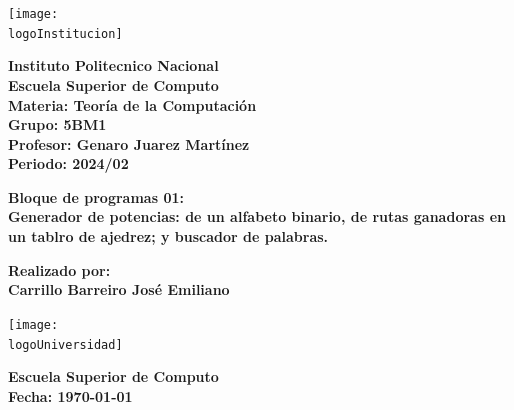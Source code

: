\documentclass{article}
\newcommand{\logoInstitucion}{logotipo_ipn.png} %
\newcommand{\logoUniversidad}{EscudoESCOM.png} %
\newcommand{\nombreInstituto}{Instituto Politecnico Nacional}
\newcommand{\facultad}{Escuela Superior de Computo}
\newcommand{\materia}{Teoría de la Computación}
\newcommand{\grupo}{5BM1}
\newcommand{\profesora}{Genaro Juarez Martínez}
\newcommand{\periodo}{2024/02}
\newcommand{\alumno}{Carrillo Barreiro José Emiliano}
\begin{document}
\begin{titlepage}
    \begin{center}
        \vspace*{1cm}

        \texttt{[image: \\logoInstitucion]}

        \vspace{1cm}

        \textbf{\LARGE \nombreInstituto} \\
        \textbf{\Large \facultad} \\
        \vspace{0.5cm}
        \textbf{\large Materia: \materia} \\
        \textbf{\large Grupo: \grupo} \\
        \vspace{0.5cm}
        \textbf{\large Profesor: \profesora} \\
        \textbf{\large Periodo: \periodo} \\

        \vspace{1cm}

        \textbf{\LARGE Bloque de programas 01:} \\
        \vspace{0.5cm}
        \textbf{\Large Generador de potencias: de un alfabeto binario, de rutas ganadoras en un tablro de ajedrez; y buscador de palabras.} \\

        \vfill

        \textbf{\large Realizado por:} \\
        \textbf{\large \alumno}

        \vspace{1cm}

        \texttt{[image: \\logoUniversidad]}

        \vspace{1cm}

        \textbf{\large \facultad} \\
        \textbf{\large Fecha: \today}

    \end{center}
\end{titlepage}

\tableofcontents
\newpage
\listofcpplistings%
\listofmatlablistings%
\listoffigures
\listoftables
\newpage
\end{document}
